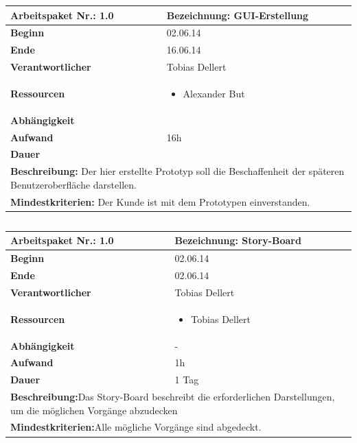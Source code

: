 \documentclass[fontsize=12pt,paper=a4,twoside]{scrartcl}
\begin{document}
\begin{verbatim} 
\end{verbatim}

\begin{tabular}{|p{5.3cm}|p{9.7cm}|}\hline
	\textbf{Arbeitspaket Nr.:} 1.0 & \textbf{Bezeichnung:} GUI-Erstellung\\ \hline \hline
	\textbf{Beginn} & 02.06.14\\ \hline
	\textbf{Ende} & 16.06.14\\ \hline
	\textbf{Verantwortlicher} & Tobias Dellert\\ \hline
	\textbf{Ressourcen} & \begin{itemize}
		\item Alexander But
	\end{itemize}    \\ \hline
	\textbf{Abhängigkeit} &\\ \hline
	\textbf{Aufwand} & 16h\\ \hline
	\textbf{Dauer} & \\ \hline
	\multicolumn{2}{|p{15cm}|}{\textbf{Beschreibung:} Der hier erstellte Prototyp soll die Beschaffenheit der späteren Benutzeroberfläche darstellen. \newline   }\\ \hline
	\multicolumn{2}{|p{15cm}|}{\textbf{Mindestkriterien:} Der Kunde ist mit dem Prototypen einverstanden.\newline }\\ \hline
\end{tabular}

\begin{verbatim} 
\end{verbatim}

\begin{tabular}{|p{5.3cm}|p{9.7cm}|}\hline
	\textbf{Arbeitspaket Nr.:} 1.0 & \textbf{Bezeichnung:} Story-Board\\ \hline \hline
	\textbf{Beginn} & 02.06.14\\ \hline
	\textbf{Ende} & 02.06.14\\ \hline
	\textbf{Verantwortlicher} & Tobias Dellert\\ \hline
	\textbf{Ressourcen} & \begin{itemize}
		\item Tobias Dellert
	\end{itemize}    \\ \hline
	\textbf{Abhängigkeit} & -\\ \hline
	\textbf{Aufwand} & 1h\\ \hline
	\textbf{Dauer} & 1 Tag\\ \hline
	\multicolumn{2}{|p{15cm}|}{\textbf{Beschreibung:}\newline  Das Story-Board beschreibt die erforderlichen Darstellungen, um die möglichen Vorgänge abzudecken }\\ \hline
	\multicolumn{2}{|p{15cm}|}{\textbf{Mindestkriterien:}\newline Alle mögliche Vorgänge sind abgedeckt. }\\ \hline
\end{tabular}
\end{document}

